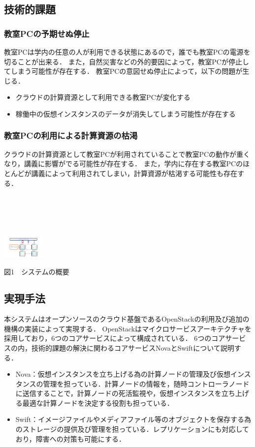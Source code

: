 \documentclass[11pt,a4paper]{jsarticle}
\begin{document}
\subsection{技術的課題}
\subsubsection{教室PCの予期せぬ停止}
教室PCは学内の任意の人が利用できる状態にあるので，誰でも教室PCの電源を切ることが出来る．
また，自然災害などの外的要因によって，教室PCが停止してしまう可能性が存在する．
教室PCの意図せぬ停止によって，以下の問題が生じる．
\begin{itemize}
	\item クラウドの計算資源として利用できる教室PCが変化する
	\item 稼働中の仮想インスタンスのデータが消失してしまう可能性が存在する
\end{itemize}
\subsubsection{教室PCの利用による計算資源の枯渇}
クラウドの計算資源として教室PCが利用されていることで教室PCの動作が重くなり，講義に影響がでる可能性が存在する．
また，学内に存在する教室PCのほとんどが講義によって利用されてしまい，計算資源が枯渇する可能性も存在する．
\\
\\
\\
\\
\\
\\
\includegraphics[width=2.1cm, bb=0 0 300 400]{graph1.pdf}
\begin{center}図1　システムの概要\end{center}

\subsection{実現手法}
本システムはオープンソースのクラウド基盤であるOpenStack\cite{openstack}の利用及び追加の機構の実装によって実現する．
OpenStackはマイクロサービスアーキテクチャを採用しており，6つのコアサービスによって構成されている．
6つのコアサービスの内，技術的課題の解決に関わるコアサービスNovaとSwiftについて説明する．
\begin{itemize}
	\item Nova：仮想インスタンスを立ち上げる為の計算ノードの管理及び仮想インスタンスの管理を担っている．計算ノードの情報を，随時コントローラノードに送信することで，計算ノードの死活監視や，仮想インスタンスを立ち上げる最適な計算ノードを決定する役割も担っている．
	\item Swift：イメージファイルやメディアファイル等のオブジェクトを保存する為のストレージの提供及び管理を担っている．レプリケーションにも対応しており，障害への対策も可能にする．
\end{itemize}
\end{document}
